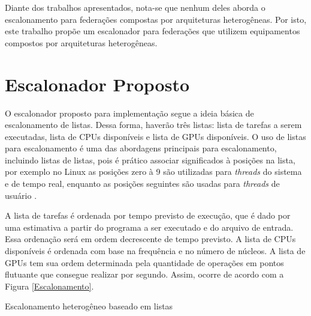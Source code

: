 Diante dos trabalhos apresentados, nota-se que nenhum deles aborda o escalonamento para federações compostas por arquiteturas heterogêneas. Por isto, este trabalho propõe um escalonador para federações que utilizem equipamentos compostos por arquiteturas heterogêneas.

\section{Escalonador Proposto}

O escalonador proposto para implementação segue a ideia básica de escalonamento de listas. Dessa forma, haverão três listas: lista de tarefas a serem executadas, lista de \acrshort{CPU}s disponíveis e lista de \acrshort{GPU}s disponíveis. O uso de listas para escalonamento é uma das abordagens principais para escalonamento, incluindo listas de listas\cite{MultilevelFQ}, pois é prático associar significados à posições na lista, por exemplo no Linux as posições zero à 9 são utilizadas para \textit{threads} do sistema e de tempo real, enquanto as posições seguintes são usadas para \textit{threads} de usuário \cite{KernelsComp}.

A lista de tarefas é ordenada por tempo previsto de execução, que é dado por uma estimativa a partir do programa a ser executado e do arquivo de entrada. Essa ordenação será em ordem decrescente de tempo previsto. A lista de \acrshort{CPU}s disponíveis é ordenada com base na frequência e no número de núcleos. A lista de \acrshort{GPU}s tem sua ordem determinada pela quantidade de operações em pontos flutuante que consegue realizar por segundo. Assim, ocorre de acordo com a Figura \ref{Escalonamento}.

\begin{algorithm}
\caption{Escalonamento heterogêneo baseado em listas}
\begin{algorithmic}
			\Else
			\EndIf
		\Else
		\EndIf
	\EndWhile
\EndProcedure
\end{algorithmic}
\end{algorithm}


